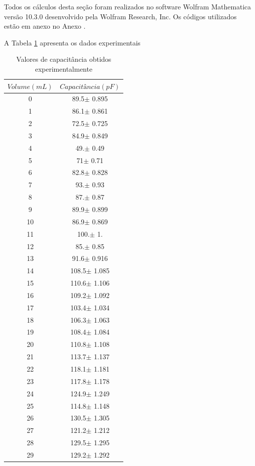 \documentclass[a4paper]{instrumentacao}
\begin{document}
Todos os cálculos desta seção foram realizados no software Wolfram Mathematica versão 10.3.0 desenvolvido pela Wolfram Research, Inc. Os códigos utilizados estão em anexo no Anexo .

A Tabela \ref{tab:resultados-pluviometro-capacitancia} apresenta os dados experimentais

\begin{longtable}{cc}
\caption{Valores de capacitância obtidos experimentalmente} \label{tab:resultados-pluviometro-capacitancia} \\
\textbf{$Volume (mL)$} & \textbf{$Capacitância (pF)$} \\ \hline
 0 & 89.5$\pm$ 0.895 \\
 1 & 86.1$\pm$ 0.861 \\
 2 & 72.5$\pm$ 0.725 \\
 3 & 84.9$\pm$ 0.849 \\
 4 & 49.$\pm$ 0.49 \\
 5 & 71$\pm$ 0.71 \\
 6 & 82.8$\pm$ 0.828 \\
 7 & 93.$\pm$ 0.93 \\
 8 & 87.$\pm$ 0.87 \\
 9 & 89.9$\pm$ 0.899 \\
 10 & 86.9$\pm$ 0.869 \\
 11 & 100.$\pm$ 1. \\
 12 & 85.$\pm$ 0.85 \\
 13 & 91.6$\pm$ 0.916 \\
 14 & 108.5$\pm$ 1.085 \\
 15 & 110.6$\pm$ 1.106 \\
 16 & 109.2$\pm$ 1.092 \\
 17 & 103.4$\pm$ 1.034 \\
 18 & 106.3$\pm$ 1.063 \\
 19 & 108.4$\pm$ 1.084 \\
 20 & 110.8$\pm$ 1.108 \\
 21 & 113.7$\pm$ 1.137 \\
 22 & 118.1$\pm$ 1.181 \\
 23 & 117.8$\pm$ 1.178 \\
 24 & 124.9$\pm$ 1.249 \\
 25 & 114.8$\pm$ 1.148 \\
 26 & 130.5$\pm$ 1.305 \\
 27 & 121.2$\pm$ 1.212 \\
 28 & 129.5$\pm$ 1.295 \\
 29 & 129.2$\pm$ 1.292 \\

\end{longtable}
\end{document}
